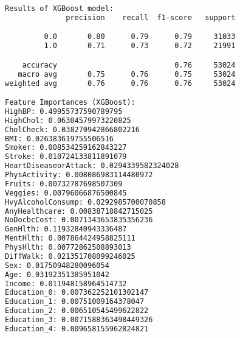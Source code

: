 \documentclass[12pt]{article}
\begin{document}
\begin{lstlisting}[language=TeX]
Results of XGBoost model:
              precision    recall  f1-score   support

         0.0       0.80      0.79      0.79     31033
         1.0       0.71      0.73      0.72     21991

    accuracy                           0.76     53024
   macro avg       0.75      0.76      0.75     53024
weighted avg       0.76      0.76      0.76     53024

Feature Importances (XGBoost):
HighBP: 0.49955737590789795
HighChol: 0.06304579973220825
CholCheck: 0.038270942866802216
BMI: 0.026383619755506516
Smoker: 0.008534259162843227
Stroke: 0.010724133811891079
HeartDiseaseorAttack: 0.0294339582324028
PhysActivity: 0.008086983114480972
Fruits: 0.00732787698507309
Veggies: 0.00796066876500845
HvyAlcoholConsump: 0.0292985700070858
AnyHealthcare: 0.00838718842715025
NoDocbcCost: 0.0071343653835356236
GenHlth: 0.11932840943336487
MentHlth: 0.007864424958825111
PhysHlth: 0.00772862508893013
DiffWalk: 0.021351708099246025
Sex: 0.01750948280096054
Age: 0.03192351385951042
Income: 0.011948158964514732
Education_0: 0.007362252101302147
Education_1: 0.00751009164378047
Education_2: 0.006510545499622822
Education_3: 0.0071588363498449326
Education_4: 0.009658155962824821

\end{lstlisting}
\end{document}
